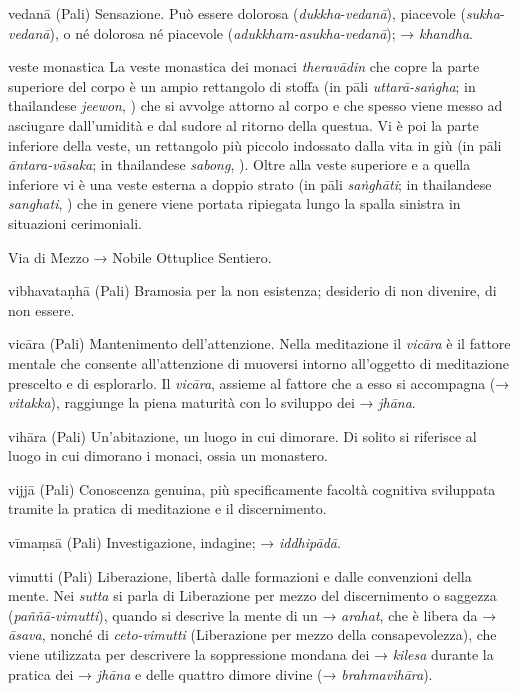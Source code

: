 \begin{glossarydescription}
\item[vedanā] (Pali) Sensazione. Può essere dolorosa
(\emph{dukkha}-\emph{vedanā}), piacevole (\emph{sukha}-\emph{vedanā}), o
né dolorosa né piacevole (\emph{adukkham-asukha-vedanā}); →
\emph{khandha}.

\item[veste monastica] La veste monastica dei monaci \emph{theravādin} che
copre la parte superiore del corpo è un ampio rettangolo di stoffa (in
pāli \emph{uttarā-saṅgha}; in thailandese \emph{jeewon}, ) che si
avvolge attorno al corpo e che spesso viene messo ad asciugare
dall'umidità e dal sudore al ritorno della questua. Vi è poi la parte
inferiore della veste, un rettangolo più piccolo indossato dalla vita in
giù (in pāli \emph{āntara-vāsaka}; in thailandese \emph{sabong}, ).
Oltre alla veste superiore e a quella inferiore vi è una veste esterna a
doppio strato (in pāli \emph{saṅghāti}; in thailandese \emph{sanghati},
) che in genere viene portata ripiegata lungo la spalla sinistra
in situazioni cerimoniali.

\item[Via di Mezzo] → Nobile Ottuplice Sentiero.

\item[vibhavataṇhā] (Pali) Bramosia per la non esistenza; desiderio di non
divenire, di non essere.

\item[vicāra] (Pali) Mantenimento dell'attenzione. Nella meditazione il
\emph{vicāra} è il fattore mentale che consente all'attenzione di
muoversi intorno all'oggetto di meditazione prescelto e di esplorarlo.
Il \emph{vicāra}, assieme al fattore che a esso si accompagna (→
\emph{vitakka}), raggiunge la piena maturità con lo sviluppo dei →
\emph{jhāna}.

\item[vihāra] (Pali) Un'abitazione, un luogo in cui dimorare. Di solito si
riferisce al luogo in cui dimorano i monaci, ossia un monastero.

\item[vijjā] (Pali) Conoscenza genuina, più specificamente facoltà cognitiva
sviluppata tramite la pratica di meditazione e il discernimento.

\item[vīmaṃsā] (Pali) Investigazione, indagine; → \emph{iddhipādā}.

\item[vimutti] (Pali) Liberazione, libertà dalle formazioni e dalle
convenzioni della mente. Nei \emph{sutta} si parla di Liberazione per
mezzo del discernimento o saggezza (\emph{paññā-vimutti}), quando si
descrive la mente di un → \emph{arahat}, che è libera da → \emph{āsava},
nonché di \emph{ceto-vimutti} (Liberazione per mezzo della
consapevolezza), che viene utilizzata per descrivere la soppressione
mondana dei → \emph{kilesa} durante la pratica dei → \emph{jhāna} e
delle quattro dimore divine (→ \emph{brahmavihāra}).


\end{glossarydescription}
